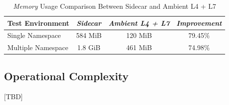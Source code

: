 \begin{table}[ht!]
  \centering
  \begin{tabular}{ |l|c|c|c| }
    \hline
    \textbf{Test Environment} & \textbf{\textit{Sidecar}} & \textbf{\textit{Ambient L4 + L7}} & \textbf{\textit{Improvement}}\\ \hline
    Single Namespace & 584 MiB & 120 MiB & 79.45\% \\ \hline
    Multiple Namespace & 1.8 GiB & 461 MiB & 74.98\% \\ \hline
  \end{tabular}
  \caption{\textit{Memory} Usage Comparison Between Sidecar and Ambient L4 + L7}
  \label{res:sidecarMemVsL4L7}
\end{table}

\subsection{Operational Complexity}
[TBD]
